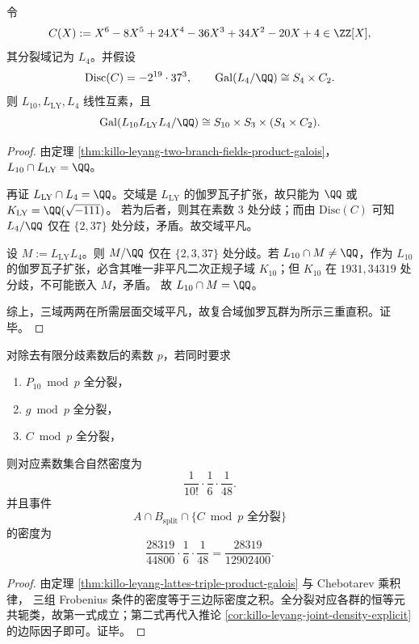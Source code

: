 \begin{theorem}\label{thm:killo-leyang-lattes-triple-product-galois}
令
\[
C(X):=X^{6}-8X^{5}+24X^{4}-36X^{3}+34X^{2}-20X+4\in\ZZ[X],
\]
其分裂域记为 \(L_4\)。并假设
\[
\mathrm{Disc}(C)=-2^{19}\cdot 37^{3},\qquad
\mathrm{Gal}(L_4/\QQ)\cong S_4\times C_2.
\]
则 \(L_{10},L_{\mathrm{LY}},L_4\) 线性互素，且
\[
\mathrm{Gal}(L_{10}L_{\mathrm{LY}}L_4/\QQ)
\cong
S_{10}\times S_3\times (S_4\times C_2).
\]
\end{theorem}
\begin{proof}
由定理 \ref{thm:killo-leyang-two-branch-fields-product-galois}，
\(
L_{10}\cap L_{\mathrm{LY}}=\QQ
\)。

再证 \(L_{\mathrm{LY}}\cap L_4=\QQ\)。交域是 \(L_{\mathrm{LY}}\) 的伽罗瓦子扩张，故只能为 \(\QQ\) 或 \(K_{\mathrm{LY}}=\QQ(\sqrt{-111})\)。
若为后者，则其在素数 \(3\) 处分歧；而由 \(\mathrm{Disc}(C)\) 可知 \(L_4/\QQ\) 仅在 \(\{2,37\}\) 处分歧，矛盾。故交域平凡。

设 \(M:=L_{\mathrm{LY}}L_4\)。则 \(M/\QQ\) 仅在 \(\{2,3,37\}\) 处分歧。若 \(L_{10}\cap M\neq \QQ\)，作为 \(L_{10}\) 的伽罗瓦子扩张，必含其唯一非平凡二次正规子域 \(K_{10}\)；但 \(K_{10}\) 在 \(1931,34319\) 处分歧，不可能嵌入 \(M\)，矛盾。
故 \(L_{10}\cap M=\QQ\)。

综上，三域两两在所需层面交域平凡，故复合域伽罗瓦群为所示三重直积。证毕。
\end{proof}

\begin{corollary}[三域同验的全分裂密度与混合事件密度]\label{cor:killo-leyang-lattes-triple-density}
对除去有限分歧素数后的素数 \(p\)，若同时要求
\begin{enumerate}
  \item \(P_{10}\bmod p\) 全分裂，
  \item \(g\bmod p\) 全分裂，
  \item \(C\bmod p\) 全分裂，
\end{enumerate}
则对应素数集合自然密度为
\[
\frac{1}{10!}\cdot\frac{1}{6}\cdot\frac{1}{48}.
\]
并且事件
\[
A\cap B_{\mathrm{split}}\cap\{\text{\(C\bmod p\) 全分裂}\}
\]
的密度为
\[
\frac{28319}{44800}\cdot\frac{1}{6}\cdot\frac{1}{48}
=\frac{28319}{12902400}.
\]
\end{corollary}
\begin{proof}
由定理 \ref{thm:killo-leyang-lattes-triple-product-galois} 与 Chebotarev 乘积律，
三组 Frobenius 条件的密度等于三边际密度之积。全分裂对应各群的恒等元共轭类，故第一式成立；第二式再代入推论 \ref{cor:killo-leyang-joint-density-explicit} 的边际因子即可。证毕。
\end{proof}

